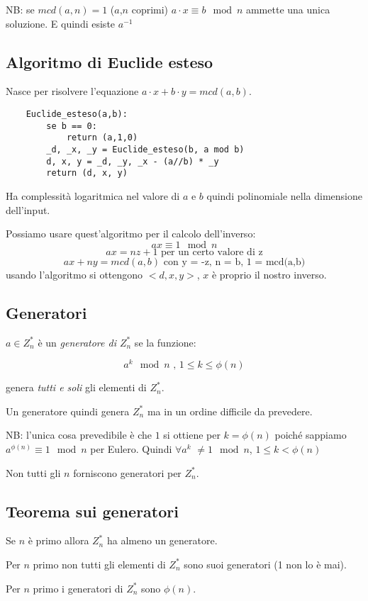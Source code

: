 NB: se $mcd(a,n)=1$ ($a$,$n$ coprimi) $a \cdot x \equiv b \mod n$ ammette una unica soluzione. E quindi esiste $a^{-1}$


\subsection{Algoritmo di Euclide esteso}
Nasce per risolvere l'equazione $a \cdot x + b \cdot y = mcd(a,b)$.
\begin{verbatim}
    Euclide_esteso(a,b):
        se b == 0:
            return (a,1,0)
        _d, _x, _y = Euclide_esteso(b, a mod b)
        d, x, y = _d, _y, _x - (a//b) * _y
        return (d, x, y)
\end{verbatim}
Ha complessità logaritmica nel valore di $a$ e $b$ quindi polinomiale nella dimensione dell'input.

Possiamo usare quest'algoritmo per il calcolo dell'inverso:
$$ ax \equiv 1 \mod n $$
$$ ax = nz + 1 \text{ per un certo valore di z} $$
$$ ax + ny = mcd(a,b) \text{ con y = -z, n = b, 1 = mcd(a,b)} $$
usando l'algoritmo si ottengono $<d, x, y>$, $x$ è proprio il nostro inverso.

\subsection{Generatori}
$a \in Z_{n}^*$ è un \emph{generatore di $Z_{n}^*$} se la funzione:

$$ a^k \mod n \text{ , } 1 \leq k \leq \phi(n) $$

genera \emph{tutti e soli} gli elementi di $Z_{n}^*$.

Un generatore quindi genera $Z_{n}^*$ ma in un ordine difficile da prevedere.

NB: l'unica cosa prevedibile è che $1$ si ottiene per $k = \phi(n)$ poiché sappiamo $a^{\phi(n)} \equiv 1 \mod n$ per Eulero. Quindi $\forall a^k$ $\neq 1 \mod n$, $ 1 \leq k < \phi(n)$

Non tutti gli $n$ forniscono generatori per $Z_{n}^*$.

\subsection{Teorema sui generatori}
Se $n$ è primo allora $Z_{n}^*$ ha almeno un generatore.

Per $n$ primo non tutti gli elementi di $Z_n^*$ sono suoi generatori (1 non lo è mai).

Per $n$ primo i generatori di $Z_n^*$ sono $\phi(n)$.

